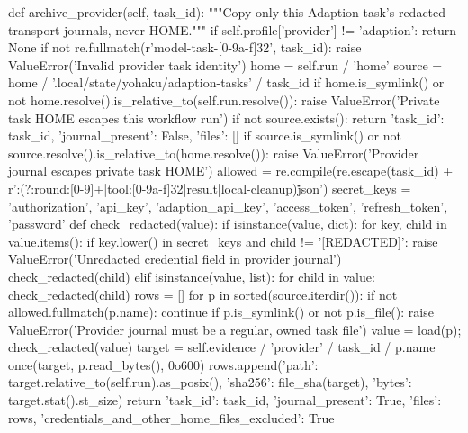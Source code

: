     def archive_provider(self, task_id):
        """Copy only this Adaption task's redacted transport journals, never HOME."""
        if self.profile['provider'] != 'adaption':
            return None
        if not re.fullmatch(r'model-task-[0-9a-f]{32}', task_id):
            raise ValueError('Invalid provider task identity')
        home = self.run / 'home'
        source = home / '.local/state/yohaku/adaption-tasks' / task_id
        if home.is_symlink() or not home.resolve().is_relative_to(self.run.resolve()):
            raise ValueError('Private task HOME escapes this workflow run')
        if not source.exists():
            return {'task_id': task_id, 'journal_present': False, 'files': []}
        if source.is_symlink() or not source.resolve().is_relative_to(home.resolve()):
            raise ValueError('Provider journal escapes private task HOME')
        allowed = re.compile(re.escape(task_id) + r':(?:round:[0-9]+|tool:[0-9a-f]{32}|result|local-cleanup)\.json')
        secret_keys = {'authorization', 'api_key', 'adaption_api_key', 'access_token', 'refresh_token', 'password'}
        def check_redacted(value):
            if isinstance(value, dict):
                for key, child in value.items():
                    if key.lower() in secret_keys and child != '[REDACTED]':
                        raise ValueError('Unredacted credential field in provider journal')
                    check_redacted(child)
            elif isinstance(value, list):
                for child in value:
                    check_redacted(child)
        rows = []
        for p in sorted(source.iterdir()):
            if not allowed.fullmatch(p.name):
                continue
            if p.is_symlink() or not p.is_file():
                raise ValueError('Provider journal must be a regular, owned task file')
            value = load(p); check_redacted(value)
            target = self.evidence / 'provider' / task_id / p.name
            once(target, p.read_bytes(), 0o600)
            rows.append({'path': target.relative_to(self.run).as_posix(),
                         'sha256': file_sha(target), 'bytes': target.stat().st_size})
        return {'task_id': task_id, 'journal_present': True, 'files': rows,
                'credentials_and_other_home_files_excluded': True}

